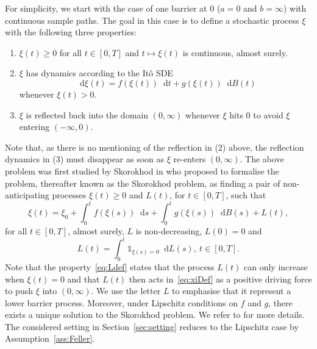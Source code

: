 \documentclass[11pt]{amsart}
\newcommand*\diff{\mathop{}\!\mathrm{d}}
\begin{document}
{For simplicity, we start with the case of one barrier at $0$ ($a=0$ and $b=\infty$) with continuous sample paths. The goal in this case is to define a stochastic process $\xi$ with the following three properties:
\begin{enumerate}
\item $\xi(t) \geq 0$ for all $t \in [0,T]$ and $t \mapsto \xi(t)$ is continuous, almost surely.
\item $\xi$ has dynamics according to the Itô SDE
\begin{equation*}
\diff \xi(t) = f(\xi(t)) \diff t + g(\xi(t)) \diff B(t)
\end{equation*}
whenever $\xi(t) >0$.
\item $\xi$ is reflected back into the domain $(0,\infty)$ whenever $\xi$ hits $0$ to avoid $\xi$ entering $(-\infty,0)$.
\end{enumerate}
Note that, as there is no mentioning of the reflection in (2) above, the reflection dynamics in (3) must disappear as soon as $\xi$ re-enters $(0,\infty)$.  The above problem was first studied by Skorokhod in \cite{MR4521003} who proposed to formalise the problem, thereafter known as the Skorokhod problem, as finding a pair of non-anticipating processes $\xi(t) \geq 0$ and $L(t)$, for $t \in [0,T]$, such that
\begin{equation}\label{eq:xiDef}
\xi(t) = \xi_{0} + \int_{0}^{t} f(\xi(s)) \diff s + \int_{0}^{t} g(\xi(s)) \diff B(s) + L(t),
\end{equation}
for all $t \in [0,T]$, almost surely, $L$ is non-decreasing, $L(0)=0$ and
\begin{equation}\label{eq:Ldef}
L(t) = \int_{0}^{t} \mathbb{1}_{\xi(s)=0} \diff L(s),\ t \in [0,T].
\end{equation}
Note that the property~\eqref{eq:Ldef} states that the process $L(t)$ can only increase when $\xi(t) = 0$ and that $L(t)$ then acts in~\eqref{eq:xiDef} as a positive driving force to push $\xi$ into $(0,\infty)$. We use the letter $L$ to emphasise that it represent a lower barrier process. Moreover, under Lipschitz conditions on $f$ and $g$, there exists a unique solution to the Skorokhod problem. We refer to \cite{Pilipenko2014AnIT} for more details. The considered setting in Section~\ref{sec:setting} reduces to the Lipschitz case by Assumption~\ref{ass:Feller}.

}
\end{document}
